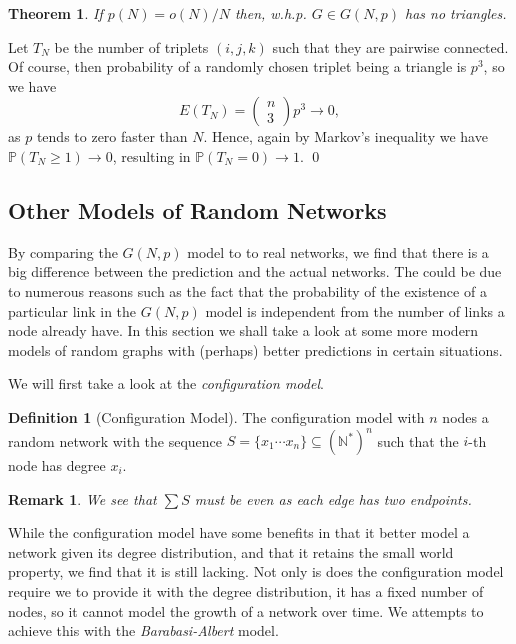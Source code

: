 \documentclass[
]{article}
\newtheorem{theorem}{Theorem}
\newtheorem*{remark}{Remark}
\theoremstyle{definition}
\newtheorem{definition}{Definition}[section]
\begin{document}
\begin{theorem}
  If \(p(N) = o(N) / N\) then, w.h.p. \(G \in G(N, p)\) has no triangles.
\end{theorem}
\proof

Let \(T_N\) be the number of triplets \((i, j ,k)\) such that they are
pairwise connected. Of course, then probability of a randomly chosen
triplet being a triangle is \(p^3\), so we have
\[E(T_N) = \begin{pmatrix} n \\ 3 \end{pmatrix} p^3 \to 0,\] as \(p\)
tends to zero faster than \(N\). Hence, again by Markov's inequality we
have \(\mathbb{P}(T_N \ge 1) \to 0\), resulting in
\(\mathbb{P}(T_N = 0) \to 1\). \qed

\hypertarget{other-models-of-random-networks}{%
\subsection{Other Models of Random
Networks}\label{other-models-of-random-networks}}

By comparing the \(G(N, p)\) model to to real networks, we find that
there is a big difference between the prediction and the actual
networks. The could be due to numerous reasons such as the fact that the
probability of the existence of a particular link in the \(G(N, p)\)
model is independent from the number of links a node already have. In
this section we shall take a look at some more modern models of random
graphs with (perhaps) better predictions in certain situations.

We will first take a look at the \emph{configuration model}.

\begin{definition}[Configuration Model]
  The configuration model with \(n\) nodes a random network with the
  sequence \(S = \{x_1 \cdots x_n\} \subseteq (\mathbb{N}^*)^n\) such that the 
  \(i\)-th node has degree \(x_i\).
\end{definition}

\begin{remark}
  We see that \(\sum S\) must be even as each edge has two endpoints.
\end{remark}

While the configuration model have some benefits in that it better model
a network given its degree distribution, and that it retains the small
world property, we find that it is still lacking. Not only is does the
configuration model require we to provide it with the degree
distribution, it has a fixed number of nodes, so it cannot model the
growth of a network over time. We attempts to achieve this with the
\emph{Barabasi-Albert} model.
\end{document}
